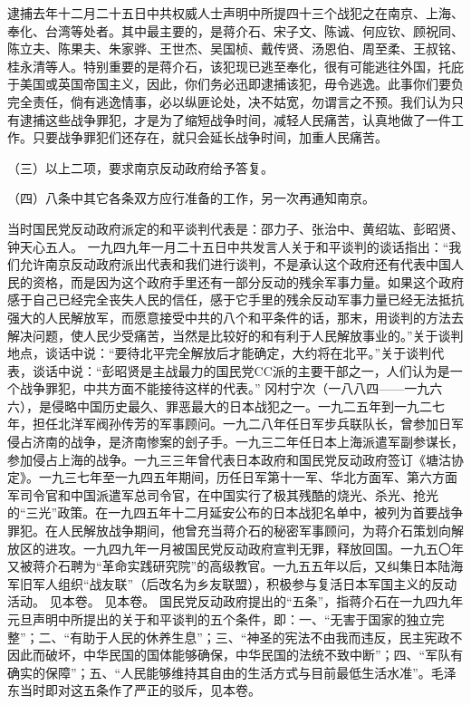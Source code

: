 逮捕去年十二月二十五日中共权威人士声明中所提四十三个战犯之在南京、上海、奉化、台湾等处者。其中最主要的，是蒋介石、宋子文、陈诚、何应钦、顾祝同、陈立夫、陈果夫、朱家骅、王世杰、吴国桢、戴传贤、汤恩伯、周至柔、王叔铭、桂永清等人。特别重要的是蒋介石，该犯现已逃至奉化，很有可能逃往外国，托庇于美国或英国帝国主义，因此，你们务必迅即逮捕该犯，毋令逃逸。此事你们要负完全责任，倘有逃逸情事，必以纵匪论处，决不姑宽，勿谓言之不预。我们认为只有逮捕这些战争罪犯，才是为了缩短战争时间，减轻人民痛苦，认真地做了一件工作。只要战争罪犯们还存在，就只会延长战争时间，加重人民痛苦。

（三）以上二项，要求南京反动政府给予答复。

（四）八条中其它各条双方应行准备的工作，另一次再通知南京。


\begin{maonote}
当时国民党反动政府派定的和平谈判代表是：邵力子、张治中、黄绍竑、彭昭贤、钟天心五人。
一九四九年一月二十五日中共发言人关于和平谈判的谈话指出：“我们允许南京反动政府派出代表和我们进行谈判，不是承认这个政府还有代表中国人民的资格，而是因为这个政府手里还有一部分反动的残余军事力量。如果这个政府感于自己已经完全丧失人民的信任，感于它手里的残余反动军事力量已经无法抵抗强大的人民解放军，而愿意接受中共的八个和平条件的话，那末，用谈判的方法去解决问题，使人民少受痛苦，当然是比较好的和有利于人民解放事业的。”关于谈判地点，谈话中说：“要待北平完全解放后才能确定，大约将在北平。”关于谈判代表，谈话中说：“彭昭贤是主战最力的国民党CC派的主要干部之一，人们认为是一个战争罪犯，中共方面不能接待这样的代表。”
冈村宁次（一八八四——一九六六），是侵略中国历史最久、罪恶最大的日本战犯之一。一九二五年到一九二七年，担任北洋军阀孙传芳的军事顾问。一九二八年任日军步兵联队长，曾参加日军侵占济南的战争，是济南惨案的刽子手。一九三二年任日本上海派遣军副参谋长，参加侵占上海的战争。一九三三年曾代表日本政府和国民党反动政府签订《塘沽协定》。一九三七年至一九四五年期间，历任日军第十一军、华北方面军、第六方面军司令官和中国派遣军总司令官，在中国实行了极其残酷的烧光、杀光、抢光的“三光”政策。在一九四五年十二月延安公布的日本战犯名单中，被列为首要战争罪犯。在人民解放战争期间，他曾充当蒋介石的秘密军事顾问，为蒋介石策划向解放区的进攻。一九四九年一月被国民党反动政府宣判无罪，释放回国。一九五〇年又被蒋介石聘为“革命实践研究院”的高级教官。一九五五年以后，又纠集日本陆海军旧军人组织“战友联”（后改名为乡友联盟），积极参与复活日本军国主义的反动活动。
见本卷。
见本卷。
国民党反动政府提出的“五条”，指蒋介石在一九四九年元旦声明中所提出的关于和平谈判的五个条件，即：一、“无害于国家的独立完整”；二、“有助于人民的休养生息”；三、“神圣的宪法不由我而违反，民主宪政不因此而破坏，中华民国的国体能够确保，中华民国的法统不致中断”；四、“军队有确实的保障”；五、“人民能够维持其自由的生活方式与目前最低生活水准”。毛泽东当时即对这五条作了严正的驳斥，见本卷。

\end{maonote}
